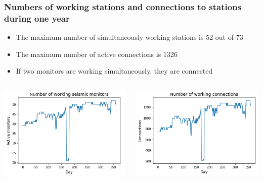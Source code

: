 \documentclass{beamer}
\begin{document}
\begin{frame}
\frametitle{Numbers of working stations and connections to stations during one year}
\begin{itemize}
\item The maximum number of simultaneously working stations is 52 out of 73
\item The maximum number of active connections is 1326
\item If two monitors are working simultaneously, they are connected
\end{itemize}

\begin{columns}
\includegraphics[width=\textwidth]{working_monitors-presentation.png}

\includegraphics[width=\textwidth]{working_connections_presentation.png}
\end{columns}
\end{frame}
\end{document}
